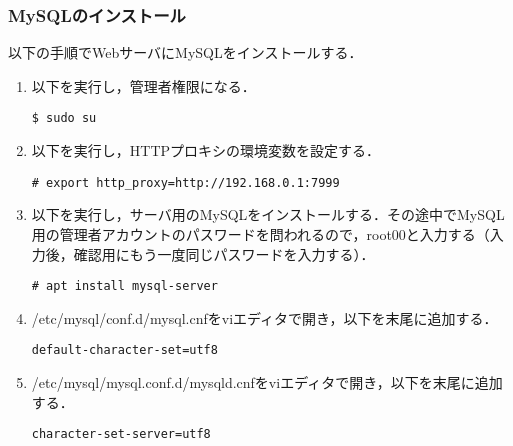 \documentclass[a4j,titlepage]{jarticle}
\begin{document}
\begin{itemize}
\subsubsection{MySQLのインストール}
以下の手順でWebサーバにMySQLをインストールする．
\begin{enumerate}

\item 以下を実行し，管理者権限になる．
\begin{screen}
\begin{center}
\begin{verbatim}
$ sudo su
\end{verbatim}
\end{center}
\end{screen}

\item 以下を実行し，HTTPプロキシの環境変数を設定する．
\begin{screen}
\begin{center}
\begin{verbatim}
# export http_proxy=http://192.168.0.1:7999
\end{verbatim}
\end{center}
\end{screen}

\item 以下を実行し，サーバ用のMySQLをインストールする．その途中でMySQL用の管理者アカウントのパスワードを問われるので，root00と入力する（入力後，確認用にもう一度同じパスワードを入力する）．
\begin{screen}
\begin{center}
\begin{verbatim}
# apt install mysql-server
\end{verbatim}
\end{center}
\end{screen}

\item /etc/mysql/conf.d/mysql.cnfをviエディタで開き，以下を末尾に追加する．

\begin{screen}
\begin{center}
\begin{verbatim}
default-character-set=utf8
\end{verbatim}
\end{center}
\end{screen}

\item /etc/mysql/mysql.conf.d/mysqld.cnfをviエディタで開き，以下を末尾に追加する．
\begin{screen}
\begin{center}
\begin{verbatim}
character-set-server=utf8
\end{verbatim}
\end{center}
\end{screen}


\end{enumerate}
\end{itemize}
\end{document}
